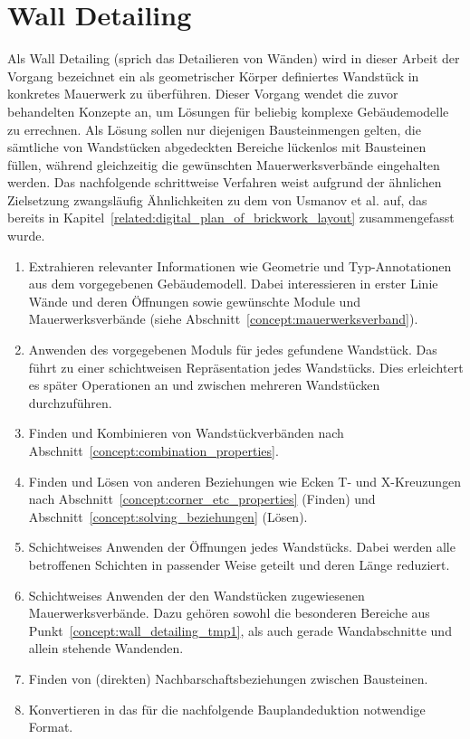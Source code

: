 \section{Wall Detailing}
\label{concept:wall_detailing}
Als \glqq{}Wall Detailing\grqq{} (sprich das \glqq{}Detailieren von Wänden\grqq{}) wird in dieser Arbeit der Vorgang bezeichnet ein als geometrischer Körper definiertes Wandstück in konkretes Mauerwerk zu überführen.
Dieser Vorgang wendet die zuvor behandelten Konzepte an, um Lösungen für beliebig komplexe Gebäudemodelle zu errechnen.
Als Lösung sollen nur diejenigen Bausteinmengen gelten, die sämtliche von Wandstücken abgedeckten Bereiche lückenlos mit Bausteinen füllen, während gleichzeitig die gewünschten Mauerwerksverbände eingehalten werden.
Das nachfolgende schrittweise Verfahren weist aufgrund der ähnlichen Zielsetzung zwangsläufig Ähnlichkeiten zu dem von Usmanov et al. auf, das bereits in Kapitel~\ref{related:digital_plan_of_brickwork_layout} zusammengefasst wurde.

\begin{enumerate}
    \item Extrahieren relevanter Informationen wie Geometrie und Typ-Annotationen aus dem vorgegebenen Gebäudemodell. Dabei interessieren in erster Linie Wände und deren Öffnungen sowie gewünschte Module und Mauerwerksverbände (siehe Abschnitt~\ref{concept:mauerwerksverband}).
    \item Anwenden des vorgegebenen Moduls für jedes gefundene Wandstück. Das führt zu einer schichtweisen Repräsentation jedes Wandstücks. Dies erleichtert es später Operationen an und zwischen mehreren Wandstücken durchzuführen.
    \item Finden und Kombinieren von Wandstückverbänden nach Abschnitt~\ref{concept:combination_properties}.
    \item\label{concept:wall_detailing_tmp1} Finden und Lösen von anderen Beziehungen wie Ecken T- und X-Kreuzungen nach Abschnitt~\ref{concept:corner_etc_properties} (Finden) und Abschnitt~\ref{concept:solving_beziehungen} (Lösen).
    \item Schichtweises Anwenden der Öffnungen jedes Wandstücks. Dabei werden alle betroffenen Schichten in passender Weise geteilt und deren Länge reduziert.
    \item Schichtweises Anwenden der den Wandstücken zugewiesenen Mauerwerksverbände. Dazu gehören sowohl die besonderen Bereiche aus Punkt~\ref{concept:wall_detailing_tmp1}, als auch gerade Wandabschnitte und allein stehende Wandenden.
    \item\label{concept:wall_detailing_tmp2} Finden von (direkten) Nachbarschaftsbeziehungen zwischen Bausteinen.
    \item Konvertieren in das für die nachfolgende Bauplandeduktion notwendige Format.
\end{enumerate}


